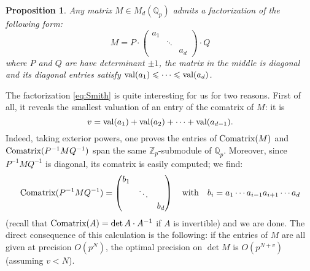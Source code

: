 \documentclass[11pt]{article}
\numberwithin{equation}{section}
\numberwithin{figure}{section}
\renewcommand{\leq}{\leqslant}
\newtheorem{prop}[theo]{Proposition}
\theoremstyle{definition}
\newcommand{\Z}{\mathbb Z}
\newcommand{\Zp}{\Z_p}
\newcommand{\Q}{\mathbb Q}
\newcommand{\Qp}{\Q_p}
\newcommand{\val}{\text{\rm val}}
\newcommand{\Com}{\text{\rm Comatrix}}
\begin{document}
\begin{prop}
\label{prop:Smith}
Any matrix $M \in M_d(\Qp)$ admits a factorization of the following
form:
\begin{equation}
\label{eq:Smith}
M = P \cdot 
\left(\begin{matrix} a_1 & & \\ & \ddots & \\ & & a_d \end{matrix}\right)
\cdot Q
\end{equation}
where $P$ and $Q$ are have determinant $\pm 1$, the matrix in the middle 
is diagonal and its diagonal entries satisfy $\val(a_1) \leq \cdots \leq 
\val(a_d)$.
\end{prop}

\noindent
The factorization \eqref{eq:Smith} is quite interesting for us for two 
reasons. First of all, it reveals the smallest valuation of an entry
of the comatrix of $M$: it is 
\begin{equation}
\label{eq:optprecdet}
v = \val(a_1) + \val(a_2) + \cdots + \val(a_{d-1}).
\end{equation}
Indeed, taking exterior powers, one proves the entries of $\Com(M)$ 
and $\Com(P^{-1} M Q^{-1})$ span the same $\Zp$-submodule of $\Qp$.
Moreover, since $P^{-1} M Q^{-1}$ is diagonal, its comatrix is easily
computed; we find:
$$\Com(P^{-1} M Q^{-1}) =
\left(\begin{matrix} b_1 & & \\ & \ddots & \\ & & b_d \end{matrix}\right)
\quad \text{with} \quad
b_i = a_1 \cdots a_{i-1} a_{i+1} \cdots a_d$$
(recall that $\Com(A) = \det A \cdot A^{-1}$ if $A$ is invertible)
and we are done. 
The direct consequence of this calculation is the following: if the 
entries of $M$ are all given at precision $O(p^N)$, the optimal 
precision on $\det M$ is $O(p^{N+v})$ (assuming $v < N$).
\end{document}
